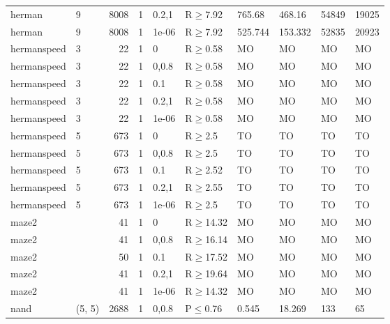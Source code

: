 \begin{longtable}{llrrllllll}
 herman        & 9        &   	8008 & 1 & 0.2,1 & R$\geq$7.92  & 765.68   & 468.16   & 54849   & 19025  \\
 herman        & 9        &   	8008 & 1 & 1e-06 & R$\geq$7.92  & 525.744  & 153.332  & 52835   & 20923  \\
 hermanspeed   & 3        &     	22 & 1 & 0     & R$\geq$0.58  & MO       & MO       & MO      & MO     \\
 hermanspeed   & 3        &     	22 & 1 & 0,0.8 & R$\geq$0.58  & MO       & MO       & MO      & MO     \\
 hermanspeed   & 3        &     	22 & 1 & 0.1   & R$\geq$0.58  & MO       & MO       & MO      & MO     \\
 hermanspeed   & 3        &     	22 & 1 & 0.2,1 & R$\geq$0.58  & MO       & MO       & MO      & MO     \\
 hermanspeed   & 3        &     	22 & 1 & 1e-06 & R$\geq$0.58  & MO       & MO       & MO      & MO     \\
 hermanspeed   & 5        &    	673 & 1 & 0     & R$\geq$2.5   & TO       & TO       & TO      & TO     \\
 hermanspeed   & 5        &    	673 & 1 & 0,0.8 & R$\geq$2.5   & TO       & TO       & TO      & TO     \\
 hermanspeed   & 5        &    	673 & 1 & 0.1   & R$\geq$2.52  & TO       & TO       & TO      & TO     \\
 hermanspeed   & 5        &    	673 & 1 & 0.2,1 & R$\geq$2.55  & TO       & TO       & TO      & TO     \\
 hermanspeed   & 5        &    	673 & 1 & 1e-06 & R$\geq$2.5   & TO       & TO       & TO      & TO     \\
 maze2         &          &     	41 & 1 & 0     & R$\geq$14.32 & MO       & MO       & MO      & MO     \\
 maze2         &          &     	41 & 1 & 0,0.8 & R$\geq$16.14 & MO       & MO       & MO      & MO     \\
 maze2         &          &     	50 & 1 & 0.1   & R$\geq$17.52 & MO       & MO       & MO      & MO     \\
 maze2         &          &     	41 & 1 & 0.2,1 & R$\geq$19.64 & MO       & MO       & MO      & MO     \\
 maze2         &          &     	41 & 1 & 1e-06 & R$\geq$14.32 & MO       & MO       & MO      & MO     \\
 nand          & (5, 5)   &   	2688 & 1 & 0,0.8 & P$\leq$0.76  & 0.545    & 18.269   & 133     & 65     \\

\end{longtable}
